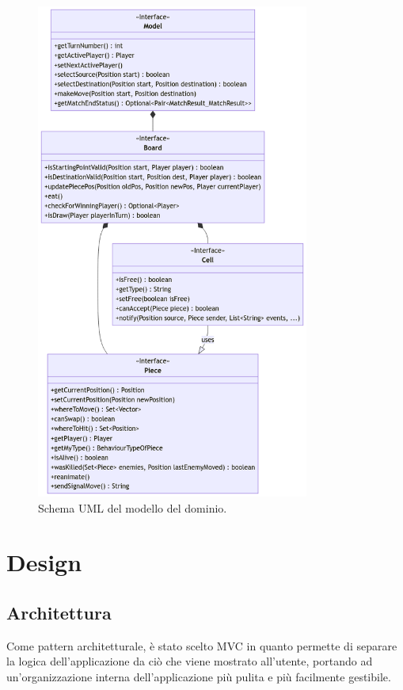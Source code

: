 \documentclass[a4paper,12pt]{report}
\begin{document}
\begin{figure}[H]
\centering
\includegraphics[width=0.8\textwidth]{images/analysis.png}
\caption{Schema UML del modello del dominio.}
\label{images:analysis}
\end{figure}

\chapter{Design}

\section{Architettura}

Come pattern architetturale, è stato scelto MVC in quanto permette di separare la logica dell'applicazione da ciò che viene mostrato all'utente, portando ad un'organizzazione interna dell'applicazione più pulita e più facilmente gestibile.
\end{document}
